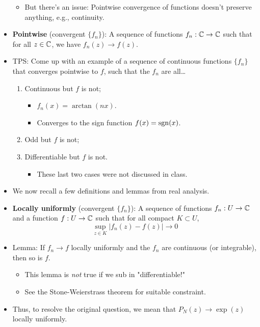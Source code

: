 \documentclass[../notes.tex]{subfiles}
\begin{document}
\begin{itemize}
\begin{itemize}
\begin{itemize}
        \end{itemize}
        \item But there's an issue: Pointwise convergence of functions doesn't preserve anything, e.g., continuity.
    \end{itemize}
    \item \textbf{Pointwise} (convergent $\{f_n\}$): A sequence of functions $f_n:\mathbb{C}\to\mathbb{C}$ such that for all $z\in\mathbb{C}$, we have $f_n(z)\to f(z)$.
    \item TPS: Come up with an example of a sequence of continuous functions $\{f_n\}$ that converges pointwise to $f$, such that the $f_n$ are all\dots
    \begin{enumerate}
        \item Continuous but $f$ is not;
        \begin{itemize}
            \item $f_n(x)=\arctan(nx)$.
            \item Converges to the sign function $f(x)=\operatorname{sgn}(x)$.
        \end{itemize}
        \item Odd but $f$ is not;
        \item Differentiable but $f$ is not.
        \begin{itemize}
            \item These last two cases were not discussed in class.
        \end{itemize}
    \end{enumerate}
    \item We now recall a few definitions and lemmas from real analysis.
    \item \textbf{Locally uniformly} (convergent $\{f_n\}$): A sequence of functions $f_n:U\to\mathbb{C}$ and a function $f:U\to\mathbb{C}$ such that for all compact $K\subset U$,
    \begin{equation*}
        \sup_{z\in K}|f_n(z)-f(z)| \to 0
    \end{equation*}
    \item Lemma: If $f_n\to f$ locally uniformly and the $f_n$ are continuous (or integrable), then so is $f$.
    \begin{itemize}
        \item This lemma is \emph{not} true if we sub in "differentiable!"
        \item See the Stone-Weierstrass theorem for suitable constraint.
    \end{itemize}
    \item Thus, to resolve the original question, we mean that $P_N(z)\to\exp(z)$ locally uniformly.

\end{itemize}
\end{document}
